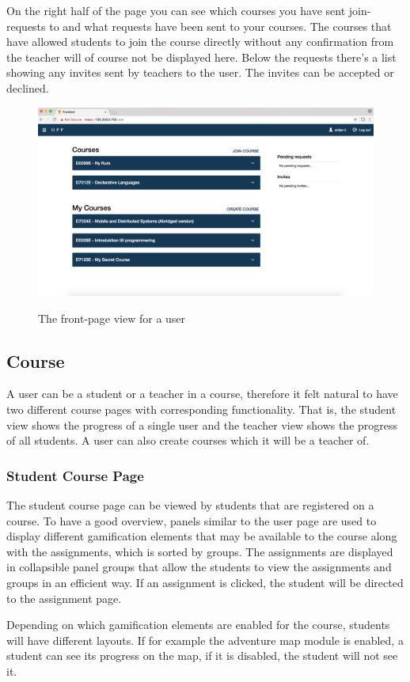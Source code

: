 On the right half of the page you can see which courses you have sent join-requests to and what requests have been sent to your courses. The courses that have allowed students to join the course directly without any confirmation from the teacher will of course not be displayed here. Below the requests there's a list showing any invites sent by teachers to the user. The invites can be accepted or declined.
\begin{figure}[H]
    \centering
    \includegraphics[width=.5\textwidth]{img/gppinpictures/user.png}
    \label{fig:student}
    \caption{The front-page view for a user}
\end{figure}

\subsection{Course}
A user can be a student or a teacher in a course, therefore it felt natural to have two different course pages with corresponding functionality. That is, the student view shows the progress of a single user and the teacher view shows the progress of all students. A user can also create courses which it will be a teacher of. 

\subsubsection{Student Course Page}
The student course page can be viewed by students that are registered on a course. To have a good overview, panels similar to the user page are used to display different gamification elements that may be available to the course along with the assignments, which is sorted by groups. The assignments are displayed in collapsible panel groups that allow the students to view the assignments and groups in an efficient way. If an assignment is clicked, the student will be directed to the assignment page. 

Depending on which gamification elements are enabled for the course, students will have different layouts. If for example the adventure map module is enabled, a student can see its progress on the map, if it is disabled, the student will not see it.

